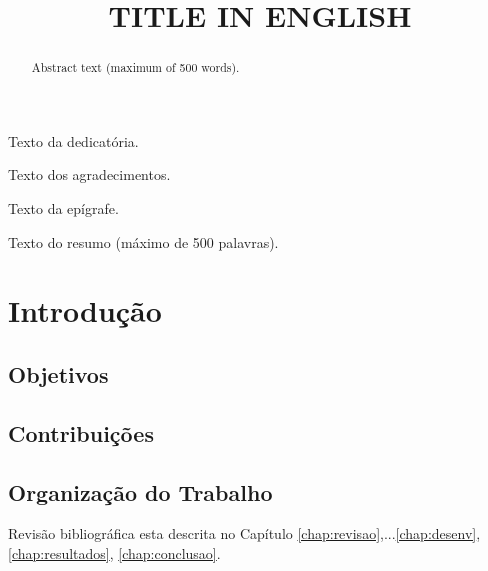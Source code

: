 \documentclass[openright]{normas-utf-tex} %
\title{\MakeUppercase{Title in english}} %
\begin{document}
\capa %
\folhaderosto %

\begin{dedicatoria}
Texto da dedicatória.
\end{dedicatoria}

\begin{agradecimentos}
Texto dos agradecimentos.
\end{agradecimentos}

\begin{epigrafe}
Texto da epígrafe.
\end{epigrafe}

\begin{resumo}
Texto do resumo (máximo de 500 palavras).
\end{resumo}

\begin{abstract}
Abstract text (maximum of 500 words).
\end{abstract}

\listadefiguras %
\listadetabelas %
\listadesiglas %
\listadesimbolos %
\sumario 

%
%
\chapter{Introdução}



\section{Objetivos}



\section{Contribuições}



\section{Organização do Trabalho}
Revisão bibliográfica esta descrita no Capítulo \ref{chap:revisao},...\ref{chap:desenv}, \ref{chap:resultados}, \ref{chap:conclusao}.
\end{document}
